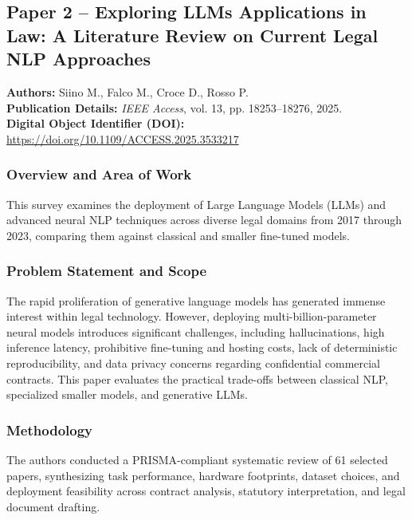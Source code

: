\subsection*{Paper 2 -- Exploring LLMs Applications in Law: A Literature Review on Current Legal NLP Approaches}
\label{subsec:paper2}

\noindent\textbf{Authors:} Siino M., Falco M., Croce D., Rosso P. \\
\textbf{Publication Details:} \textit{IEEE Access}, vol. 13, pp. 18253--18276, 2025. \\
\textbf{Digital Object Identifier (DOI):} \url{https://doi.org/10.1109/ACCESS.2025.3533217}

\subsubsection*{Overview and Area of Work}
This survey examines the deployment of Large Language Models (LLMs) and advanced neural NLP techniques across diverse legal domains from 2017 through 2023, comparing them against classical and smaller fine-tuned models.

\subsubsection*{Problem Statement and Scope}
The rapid proliferation of generative language models has generated immense interest within legal technology. However, deploying multi-billion-parameter neural models introduces significant challenges, including hallucinations, high inference latency, prohibitive fine-tuning and hosting costs, lack of deterministic reproducibility, and data privacy concerns regarding confidential commercial contracts. This paper evaluates the practical trade-offs between classical NLP, specialized smaller models, and generative LLMs.

\subsubsection*{Methodology}
The authors conducted a PRISMA-compliant systematic review of 61 selected papers, synthesizing task performance, hardware footprints, dataset choices, and deployment feasibility across contract analysis, statutory interpretation, and legal document drafting.

